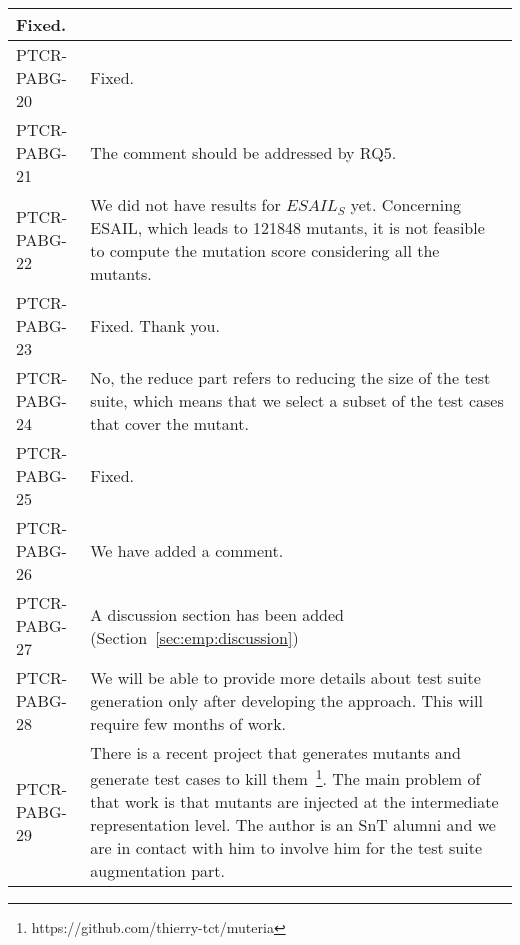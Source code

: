 \begin{longtable}{|p{1.5cm}|p{12cm}|@{}}
\begin{minipage}{12cm}
Fixed.
\end{minipage}\\
\hline
PTCR-PABG-20&
\begin{minipage}{12cm}
Fixed.
\end{minipage}\\
\hline
PTCR-PABG-21&
\begin{minipage}{12cm}
The comment should be addressed by RQ5.
\end{minipage}\\
\hline
PTCR-PABG-22&
\begin{minipage}{12cm}
We did not have results for $ESAIL_S$ yet. Concerning ESAIL, which leads to 121848 mutants, it is not feasible to compute the mutation score considering all the mutants.
\end{minipage}\\
\hline
PTCR-PABG-23&
\begin{minipage}{12cm}
Fixed. Thank you.
\end{minipage}\\
\hline
PTCR-PABG-24&
\begin{minipage}{12cm}
No, the reduce part refers to reducing the size of the test suite, which means that we select a subset of the test cases that cover the mutant.
\end{minipage}\\
\hline
PTCR-PABG-25&
\begin{minipage}{12cm}
Fixed.
\end{minipage}\\
\hline
PTCR-PABG-26&
\begin{minipage}{12cm}
We have added a comment.
\end{minipage}\\
\hline
PTCR-PABG-27&
\begin{minipage}{12cm}
A discussion section has been added (Section~\ref{sec:emp:discussion})
\end{minipage}\\
\hline
PTCR-PABG-28&
\begin{minipage}{12cm}
We will be able to provide more details about test suite generation only after developing the approach. This will require few months of work.
\end{minipage}\\
\hline
PTCR-PABG-29&
\begin{minipage}{12cm}
There is a recent project that generates mutants and generate test cases to kill them~\footnote{https://github.com/thierry-tct/muteria}. The main problem of that work is that mutants are injected at the intermediate representation level. The author is an SnT alumni and we are in contact with him to involve him for the test suite augmentation part.

\end{minipage}
\end{longtable}
